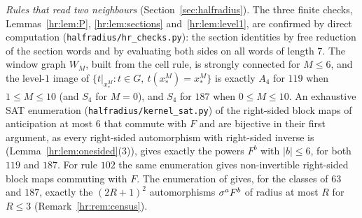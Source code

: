 \emph{Rules that read two neighbours} (Section~\ref{sec:halfradius}). The three finite checks, Lemmas~\ref{hr:lem:P}, \ref{hr:lem:sections} and~\ref{hr:lem:level1}, are confirmed by direct computation (\texttt{halfradius/hr\_checks.py}): the section identities by free reduction of the section words and by evaluating both sides on all words of length $7$. The window graph $W_M$, built from the cell rule, is strongly connected for $M\le6$, and the level-$1$ image of $\{t|_{x_*^M}:t\in G,\ t(x_*^M)=x_*^M\}$ is exactly $A_4$ for $119$ when $1\le M\le10$ (and $S_4$ for $M=0$), and $S_4$ for $187$ when $0\le M\le10$. An exhaustive SAT enumeration (\texttt{halfradius/kernel\_sat.py}) of the right-sided block maps of anticipation at most $6$ that commute with $F$ and are bijective in their first argument, as every right-sided automorphism with right-sided inverse is (Lemma~\ref{hr:lem:onesided}(3)), gives exactly the powers $F^b$ with $|b|\le6$, for both $119$ and $187$. For rule $102$ the same enumeration gives non-invertible right-sided block maps commuting with $F$. The enumeration of \cite{PaperD} gives, for the classes of $63$ and $187$, exactly the $(2R+1)^2$ automorphisms $\sigma^aF^b$ of radius at most $R$ for $R\le3$ (Remark~\ref{hr:rem:census}).
